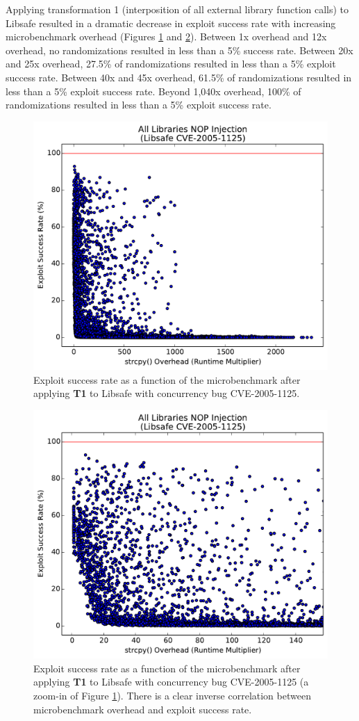Applying transformation 1 (interposition of all external library function calls) to Libsafe resulted in a dramatic decrease in exploit success rate with increasing microbenchmark overhead (Figures \ref{fig_libsafe-all} and \ref{fig_libsafe-all-zoom}).
Between 1x overhead and 12x overhead, no randomizations resulted in less than a 5\% success rate.
Between 20x and 25x overhead, 27.5\% of randomizations resulted in less than a 5\% exploit success rate.
Between 40x and 45x overhead, 61.5\% of randomizations resulted in less than a 5\% exploit success rate.
Beyond 1,040x overhead, 100\% of randomizations resulted in less than a 5\% exploit success rate.
\begin{figure}
	\centering
	\includegraphics[width=.75\columnwidth]{figures/libsafe-all}
	\caption{Exploit success rate as a function of the microbenchmark after applying \textbf{T1} to Libsafe with concurrency bug CVE-2005-1125.}
	\label{fig_libsafe-all}
\end{figure}
\begin{figure}
	\centering
	\includegraphics[width=.75\columnwidth]{figures/libsafe-all-zoom}
	\caption{
		Exploit success rate as a function of the microbenchmark after applying \textbf{T1} to Libsafe with concurrency bug CVE-2005-1125 (a zoom-in of Figure \ref{fig_libsafe-all}).
		There is a clear inverse correlation between microbenchmark overhead and exploit success rate.
	}
	\label{fig_libsafe-all-zoom}
\end{figure}

